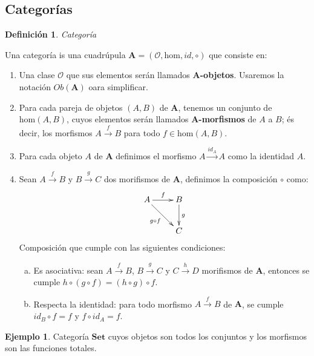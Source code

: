 \documentclass[11pt,a4paper,openright,oneside]{article}
\numberwithin{equation}{section}
\newtheorem{defi}[teo]{Definici\'on}
\theoremstyle{definition}
\newtheorem{ex}[teo]{Ejemplo}
\begin{document}
\subsection{Categor\'ias}
\begin{defi}
    Categor\'ia
\end{defi}
Una categor\'ia is una cuadr\'upula $\mathbf{A} = (\mathcal{O}, \text{hom}, \mathit{id}, \circ)$ que consiste en:
\begin{enumerate}[(1)]
    \item Una clase $\mathcal{O}$ que sus elementos ser\'an llamados $\mathbf{A}$\textbf{-objetos}. Usaremos la notaci\'on $\mathit{Ob}(\mathbf{A})$ oara simplificar.
    \item Para cada pareja de objetos $(A, B)$ de $\mathbf{A}$, tenemos un conjunto de $\text{hom}(A,B)$, cuyos elementos ser\'an llamados $\mathbf{A}$\textbf{-morfismos} de $A$ a $B$; \'es decir, los morfismos $A \overset{f}{\longrightarrow} B$ para todo $f \in \text{hom}(A,B)$.
    \item Para cada objeto $A$ de $\mathbf{A}$ definimos el morfismo $A \overset{\mathit{id}_{A}}{\longrightarrow} A$ como la identidad $A$.
    \item Sean $A \overset{f}{\longrightarrow} B$ y $B \overset{g}{\longrightarrow} C$ dos morifismos de $\mathbf{A}$, definimos la composici\'on $\circ$ como:
          $$
              \xymatrix{
                  A \ar[rd]_{g\circ f} \ar[r]^f
                  &B \ar[d]^g\\
                  &C
              }
          $$
          Composici\'on que cumple con las siguientes condiciones:
          \begin{enumerate}[(a)]
              \item Es asociativa: sean $A \overset{f}{\longrightarrow} B$, $B \overset{g}{\longrightarrow} C$ y $C \overset{h}{\longrightarrow} D$ morifismos de $\mathbf{A}$, entonces se cumple $h\circ (g\circ f) = (h\circ g)\circ f$.
              \item Respecta la identidad: para todo morfismo $A \overset{f}{\longrightarrow} B$ de $\mathbf{A}$, se cumple $\mathit{id}_B\circ f = f$ y $f\circ \mathit{id}_A = f$.
          \end{enumerate}
\end{enumerate}
\begin{ex}
    Categor\'ia $\mathbf{Set}$ cuyos objetos son todos los conjuntos y los morfismos son las funciones totales.
\end{ex}
\end{document}
